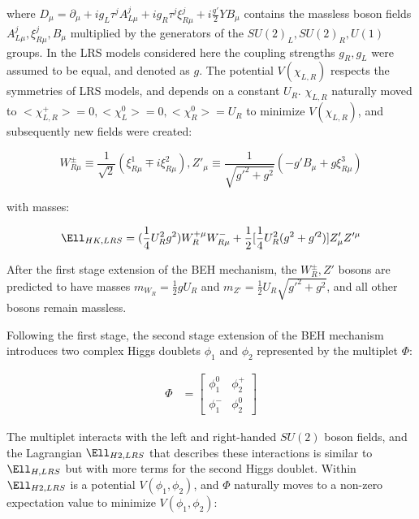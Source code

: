 where $D_{\mu} = \partial_{\mu} + ig_{L}\tau^{j}A^{j}_{L\mu} + ig_{R}\tau^{j}\xi^{j}_{R\mu} + i\frac{g'}{2}YB_{\mu}$ contains 
the massless boson fields $A^{j}_{L\mu}, \xi^{j}_{R\mu}, B_{\mu}$ multiplied by the generators of the $SU(2)_{L}, SU(2)_{R}, U(1)$ groups.  
In the LRS models considered here the coupling strengths $g_{R}, g_{L}$ were assumed to be equal, and denoted as $g$.  
The potential $V(\chi_{L,R})$ respects the symmetries of LRS models, and depends on a constant $U_{R}$.  $\chi_{L,R}$ 
naturally moved to $<\chi^{+}_{L,R}> = 0, <\chi^{0}_{L}> = 0, <\chi^{0}_{R}> = U_{R}$ to minimize $V(\chi_{L,R})$, 
and subsequently new fields were created:

\begin{equation}
	W^{\pm}_{R\mu} \equiv \frac{1}{\sqrt{2}}(\xi^{1}_{R\mu} \mp i\xi^{2}_{R\mu}), 
	Z'_{\mu} \equiv \frac{1}{\sqrt{g'^{2} + g^{2}}}(-g'B_{\mu} + g\xi^{3}_{R\mu})
\end{equation}

with masses:

\begin{equation}
	\Ell_{HK,LRS} = (\frac{1}{4}U^{2}_{R}g^{2})W^{+\mu}_{R}W^{-}_{R\mu} + \frac{1}{2}[\frac{1}{4}U^{2}_{R}(g^{2} + g'^{2})]Z'_{\mu}Z'^{\mu}
\end{equation}

After the first stage extension of the BEH mechanism, the $W^{\pm}_{R}, Z'$ bosons are predicted to have masses 
$m_{W_{R}} = \frac{1}{2}gU_{R}$ and $m_{Z'} = \frac{1}{2}U_{R}\sqrt{g'^{2} + g^{2}}$, and all other bosons remain 
massless.

Following the first stage, the second stage extension of the BEH mechanism \cite{lrsHiggsStageOne,lrsHiggsStageTwo} 
introduces two complex Higgs doublets $\phi_{1}$ and $\phi_{2}$ represented by the multiplet $\Phi$:

\begin{align}
	\Phi &= \begin{bmatrix}
	\phi^{0}_{1} & \phi^{+}_{2} \\
	\phi^{-}_{1} & \phi^{0}_{2}
	\end{bmatrix}
\end{align}

The multiplet interacts with the left and right-handed $SU(2)$ boson fields, and the Lagrangian $\Ell_{H2,LRS}$ that 
describes these interactions is similar to $\Ell_{H,LRS}$ but with more terms for the second Higgs doublet.  Within 
$\Ell_{H2,LRS}$ is a potential $V(\phi_{1},\phi_{2})$, and $\Phi$ naturally moves to a non-zero expectation 
value to minimize $V(\phi_{1},\phi_{2})$:

